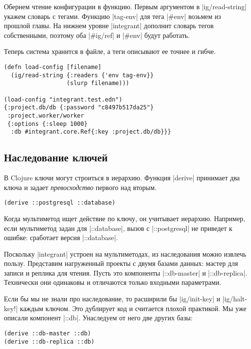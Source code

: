 Обернем чтение конфигурации в функцию. Первым аргументом в
\spverb|ig/read-string| укажем словарь с тегами. Функцию \spverb|tag-env| для
тега \spverb|#env| возьмем из прошлой главы. На нижнем уровне \spverb|integrant|
дополнит словарь тегов собственными, поэтому оба \spverb|#ig/ref| и
\spverb|#env| будут работать.

Теперь система хранится в файле, а теги описывают ее точнее и гибче.

\begin{verbatim}
(defn load-config [filename]
  (ig/read-string {:readers {'env tag-env}}
                  (slurp filename)))

(load-config "integrant.test.edn")
{:project.db/db {:password "c8497b517da25"}
 :project.worker/worker
 {:options {:sleep 1000}
  :db #integrant.core.Ref{:key :project.db/db}}}
\end{verbatim}

\subsection{Наследование ключей}

В Clojure ключи могут строиться в иерархию. Функция \spverb|derive| принимает
два ключа и задает \emph{превосходство} первого над вторым.

\begin{verbatim}
(derive ::postgresql ::database)
\end{verbatim}

Когда мультиметод ищет действие по ключу, он учитывает иерархию. Например, если
мультиметод задан для \spverb|::database|, вызов с \spverb|::postgresql| не
приведет к ошибке: сработает версия \spverb|::database|.

Поскольку \spverb|integrant| устроен на мультиметодах, из наследования можно
извлечь пользу. Представим нагруженный проекты с двумя базами данных: мастер для
записи и реплика для чтения. Пусть это компоненты \spverb|::db-master| и
\spverb|::db-replica|. Технически они одинаковы и отличаются только входными
параметрами.

Если бы мы не знали про наследование, то расширили бы \spverb|ig/init-key| и
\spverb|ig/halt-key!| каждым ключом. Это дублирует код и считается плохой
практикой. Мы уже описали компонент \spverb|::db|. Унаследуем от него две других
базы:

\begin{verbatim}
(derive ::db-master ::db)
(derive ::db-replica ::db)
\end{verbatim}

